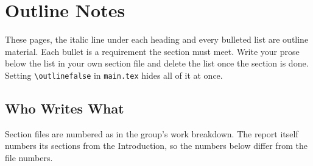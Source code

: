 \section*{Outline Notes}

These pages, the italic line under each heading and every bulleted list are outline material. Each bullet is a requirement the section must meet. Write your prose below the list in your own section file and delete the list once the section is done. Setting \texttt{\textbackslash outlinefalse} in \texttt{main.tex} hides all of it at once.

\subsection*{Who Writes What}

Section files are numbered as in the group's work breakdown. The report itself numbers its sections from the Introduction, so the numbers below differ from the file numbers.


